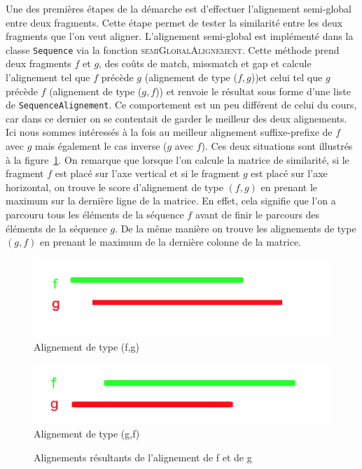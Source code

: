 Une des premières étapes de la démarche est d'effectuer l'alignement semi-global
entre deux fragments. Cette étape permet de tester la similarité entre les deux
fragments que l'on veut aligner. L'alignement semi-global est implémenté dans la
classe \verb|Sequence| via la fonction \textsc{semiGlobalAlignement}. Cette
méthode prend deux fragments $f$ et $g$, des coûts de match, missmatch et gap
et calcule l'alignement tel que $f$ précède $g$ (alignement de type ($f,g$))et celui tel que $g$ précède $f$ (alignement de type ($g,f$)) et
renvoie le résultat sous forme d'une liste de \verb|SequenceAlignement|. Ce comportement est un peu différent de celui du cours, 
car dans ce dernier on se contentait de garder le meilleur des deux alignements. Ici nous sommes intéressés à la fois  au meilleur alignement suffixe-prefixe de $f$ avec $g$ mais également le cas inverse ($g$ avec $f$). Ces deux situations sont illustrés à la figure~\ref{fig:alignementType}.
On remarque que lorsque l'on calcule la matrice de similarité, si le fragment $f$ est placé sur l'axe vertical et si le fragment $g$ est placé sur l'axe horizontal, on trouve le score d'alignement de type $(f,g)$ en prenant le maximum sur la dernière ligne de la matrice. En effet, cela signifie que l'on a parcouru tous les éléments de la séquence $f$ avant de finir le parcours des éléments de la séquence $g$. De la même manière on trouve les alignements de type $(g,f)$ en prenant le maximum de la dernière colonne de la matrice.\\

\begin{figure}
	\begin{minipage}[r]{.46\linewidth}
		\begin{center}
		\includegraphics[scale= 0.50]{(f,g).png}
		Alignement de type (f,g)
	\end{center}
	   \end{minipage} \hfill
	   \begin{minipage}[c]{.46\linewidth}
		\begin{center}
			\includegraphics[scale= 0.50]{(g,f).png}
			Alignement de type (g,f)
		\end{center}
			  \end{minipage}
		\caption{Alignements résultants de l'alignement de f et de g}
		\label{fig:alignementType}
\end{figure}


